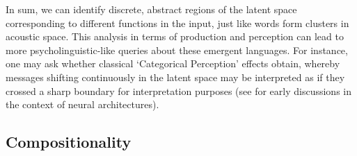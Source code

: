 \documentclass[11pt,a4paper]{article}
\newcommand{\nbEC}[1]{{\leavevmode\color{blue}{\scriptsize#1}}}
\begin{document}

In sum, we can identify discrete, abstract regions of the latent space corresponding to different functions in the input, just like words form clusters in acoustic space. This analysis in terms of production and perception can lead to more psycholinguistic-like queries about these emergent languages. For instance, one may ask whether classical `Categorical Perception' effects obtain, whereby messages shifting continuously in the latent space may be interpreted as if they crossed a sharp boundary for interpretation purposes (see \citealp{DamperHarnad-CP} for early discussions in the context of neural architectures).
\nbEC{Improve that last paragraph above? Move it to the discussion section?}






\subsection{Compositionality}
\end{document}
